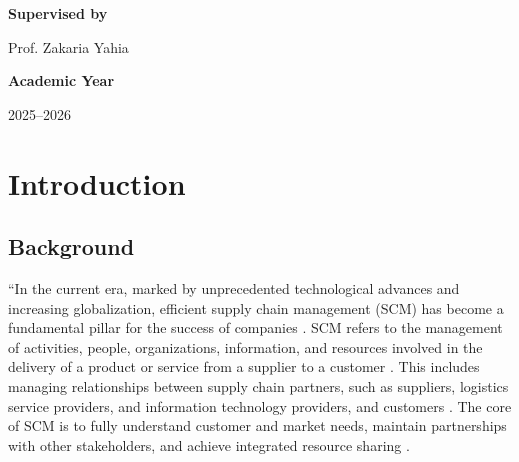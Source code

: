 \documentclass[11pt]{article}
\begin{document}
\begin{titlepage}
\vspace{0.5cm}

\begin{minipage}{0.82\textwidth}
\centering
{\large\bfseries Supervised by\par}
\vspace{0.12cm}
{\Large Prof. Zakaria Yahia\par}
\end{minipage}

\vspace{0.55cm}

{\large\bfseries Academic Year\par}
{\Large 2025--2026\par}

\vspace*{-0.15cm}
\end{titlepage}

\newpage
{}
\hypersetup{pageanchor=true}
\begingroup
\setlength{\parskip}{0pt}
\tableofcontents
\endgroup
\newpage
{}
\section{Introduction}

\subsection{Background}

``In the current era, marked by unprecedented technological advances and increasing globalization, efficient supply chain management (SCM) has become a fundamental pillar for the success of companies \cite{ref1}. SCM refers to the management of activities, people, organizations, information, and resources involved in the delivery of a product or service from a supplier to a customer \cite{ref2}. This includes managing relationships between supply chain partners, such as suppliers, logistics service providers, and information technology providers, and customers \cite{ref3}. The core of SCM is to fully understand customer and market needs, maintain partnerships with other stakeholders, and achieve integrated resource sharing \cite{ref4}.
\end{document}
